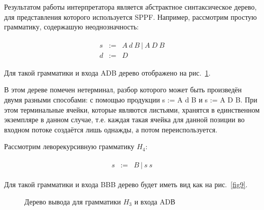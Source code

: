 Результатом работы интерпретатора является абстрактное синтаксическое дерево, для представления которого используется SPPF. Например, рассмотрим простую грамматику, содержашую неоднозначность:

\begin{align*}
\begin{array}{ccl} s & := & A \ d \ B \ | \ A \ D \ B \\ d & := & D \end{array}
\end{align*}

Для такой грамматики и входа ADB дерево отображено на рис.~\ref{fig8}.

В этом дереве помечен нетерминал, разбор которого может быть произведён двумя разными способами: с помощью продукции s := A d B и s := A D B. При этом терминальные ячейки, которые являются листьями, хранятся в единственном экземпляре в данном случае, т.е. каждая такая ячейка для данной позиции во входном потоке создаётся лишь однажды, а потом переиспользуется.

Рассмотрим леворекурсивную грамматику $H_4$:

\begin{align*}
\begin{array}{ccc} s & := & B \ | \ s \ s \end{array}
\end{align*}


Для такой грамматики и входа BBB дерево будет иметь вид как на  рис.~\ref{fig9}.


\begin{figure}[h]
\caption{Дерево вывода для грамматики $H_3$ и входа ADВ}
\label{fig8}
\end{figure}

